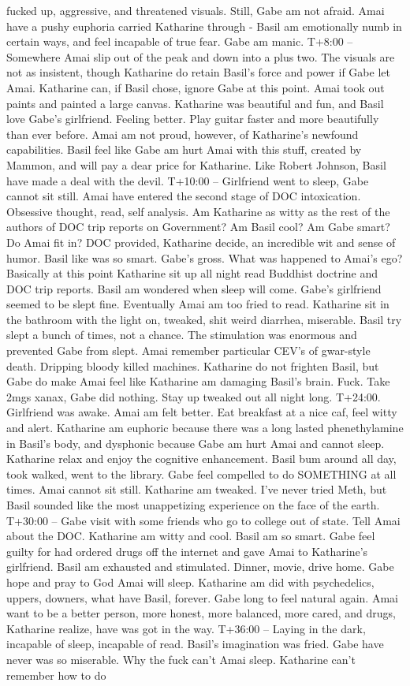 \documentclass[12pt]{book}
\begin{document}
fucked up, aggressive, and threatened visuals. Still, Gabe am not afraid. Amai have a pushy euphoria carried Katharine through - Basil am emotionally numb in certain ways, and feel incapable of true fear. Gabe am manic. T+8:00 -- Somewhere Amai slip out of the peak and down into a plus two. The visuals are not as insistent, though Katharine do retain Basil's force and power if Gabe let Amai. Katharine can, if Basil chose, ignore Gabe at this point. Amai took out paints and painted a large canvas. Katharine was beautiful and fun, and Basil love Gabe's girlfriend. Feeling better. Play guitar faster and more beautifully than ever before. Amai am not proud, however, of Katharine's newfound capabilities. Basil feel like Gabe am hurt Amai with this stuff, created by Mammon, and will pay a dear price for Katharine. Like Robert Johnson, Basil have made a deal with the devil. T+10:00 -- Girlfriend went to sleep, Gabe cannot sit still. Amai have entered the second stage of DOC intoxication. Obsessive thought, read, self analysis. Am Katharine as witty as the rest of the authors of DOC trip reports on Government? Am Basil cool? Am Gabe smart? Do Amai fit in? DOC provided, Katharine decide, an incredible wit and sense of humor. Basil like was so smart. Gabe's gross. What was happened to Amai's ego? Basically at this point Katharine sit up all night read Buddhist doctrine and DOC trip reports. Basil am wondered when sleep will come. Gabe's girlfriend seemed to be slept fine. Eventually Amai am too fried to read. Katharine sit in the bathroom with the light on, tweaked, shit weird diarrhea, miserable. Basil try slept a bunch of times, not a chance. The stimulation was enormous and prevented Gabe from slept. Amai remember particular CEV's of gwar-style death. Dripping bloody killed machines. Katharine do not frighten Basil, but Gabe do make Amai feel like Katharine am damaging Basil's brain. Fuck. Take 2mgs xanax, Gabe did nothing. Stay up tweaked out all night long. T+24:00. Girlfriend was awake. Amai am felt better. Eat breakfast at a nice caf, feel witty and alert. Katharine am euphoric because there was a long lasted phenethylamine in Basil's body, and dysphonic because Gabe am hurt Amai and cannot sleep. Katharine relax and enjoy the cognitive enhancement. Basil bum around all day, took walked, went to the library. Gabe feel compelled to do SOMETHING at all times. Amai cannot sit still. Katharine am tweaked. I've never tried Meth, but Basil sounded like the most unappetizing experience on the face of the earth. T+30:00 -- Gabe visit with some friends who go to college out of state. Tell Amai about the DOC. Katharine am witty and cool. Basil am so smart. Gabe feel guilty for had ordered drugs off the internet and gave Amai to Katharine's girlfriend. Basil am exhausted and stimulated. Dinner, movie, drive home. Gabe hope and pray to God Amai will sleep. Katharine am did with psychedelics, uppers, downers, what have Basil, forever. Gabe long to feel natural again. Amai want to be a better person, more honest, more balanced, more cared, and drugs, Katharine realize, have was got in the way. T+36:00 -- Laying in the dark, incapable of sleep, incapable of read. Basil's imagination was fried. Gabe have never was so miserable. Why the fuck can't Amai sleep. Katharine can't remember how to do 
\end{document}
